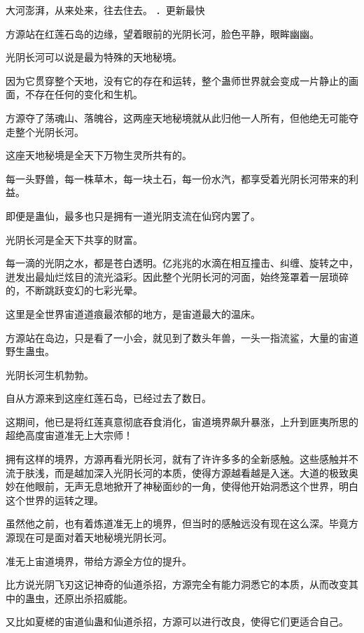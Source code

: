 
\begin{this_body}



大河澎湃，从来处来，往去住去。 ．更新最快

方源站在红莲石岛的边缘，望着眼前的光阴长河，脸色平静，眼眸幽幽。

光阴长河可以说是最为特殊的天地秘境。

因为它贯穿整个天地，没有它的存在和运转，整个蛊师世界就会变成一片静止的画面，不存在任何的变化和生机。

方源夺了荡魂山、落魄谷，这两座天地秘境就从此归他一人所有，但他绝无可能夺走整个光阴长河。

这座天地秘境是全天下万物生灵所共有的。

每一头野兽，每一株草木，每一块土石，每一份水汽，都享受着光阴长河带来的利益。

即便是蛊仙，最多也只是拥有一道光阴支流在仙窍内罢了。

光阴长河是全天下共享的财富。

每一滴的光阴之水，都是苍白透明。亿兆兆的水滴在相互撞击、纠缠、旋转之中，迸发出最灿烂炫目的流光溢彩。因此整个光阴长河的河面，始终笼罩着一层琐碎的，不断跳跃变幻的七彩光晕。

这里是全世界宙道道痕最浓郁的地方，是宙道最大的温床。

方源站在岛边，只是看了一小会，就见到了数头年兽，一头一指流鲨，大量的宙道野生蛊虫。

光阴长河生机勃勃。

自从方源来到这座红莲石岛，已经过去了数日。

这期间，他已是将红莲真意彻底吞食消化，宙道境界飙升暴涨，上升到匪夷所思的超绝高度宙道准无上大宗师！

拥有这样的境界，方源再看光阴长河，就有了许许多多的全新感触。这些感触并不流于肤浅，而是越加深入光阴长河的本质，使得方源越看越是入迷。大道的极致奥妙在他眼前，无声无息地掀开了神秘面纱的一角，使得他开始洞悉这个世界，明白这个世界的运转之理。

虽然他之前，也有着炼道准无上的境界，但当时的感触远没有现在这么深。毕竟方源现在可是面对着天地秘境光阴长河。

准无上宙道境界，带给方源全方位的提升。

比方说光阴飞刃这记神奇的仙道杀招，方源完全有能力洞悉它的本质，从而改变其中的蛊虫，还原出杀招威能。

又比如夏槎的宙道仙蛊和仙道杀招，方源可以进行改良，使得它们更适合自己。


\end{this_body}
